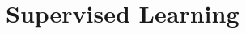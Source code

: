 \documentclass[a4paper, notitlepage]{report}
\begin{document}
%
%
%
%
%
%
%
%
%
%
%
%

\chapter{Supervised Learning}

\end{document}
